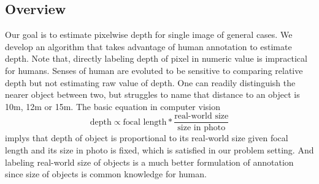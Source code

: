 \documentclass[10pt,twocolumn,letterpaper]{article}
\begin{document}
\subsection{Overview}
Our goal is to estimate pixelwise depth for single image of general cases. We develop an algorithm that takes advantage of human annotation to estimate depth. Note that, directly labeling depth of pixel in numeric value is impractical for humans. Senses of human are evoluted to be sensitive to comparing relative depth but not estimating raw value of depth. One can readily distinguish the nearer object between two, but struggles to name that distance to an object is 10m, 12m or 15m. The basic equation in computer vision
\begin{equation}
\text{depth} \propto \text{focal\ length} * \frac{\text{real-world\ size}} {\text{size\ in\ photo}}
\end{equation}
implys that depth of object is proportional to its real-world size given focal length and its size in photo is fixed, which is satisfied in our problem setting. And labeling real-world size of objects is a much better formulation of annotation since size of objects is common knowledge for human.
\end{document}
